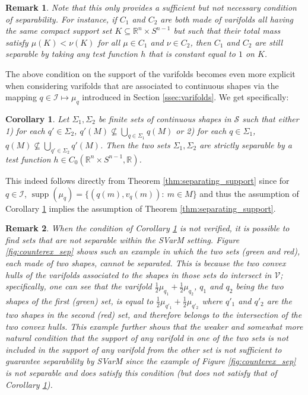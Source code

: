 \documentclass[11pt]{article}
\newtheorem{remark}{Remark}
\newtheorem{corollary}{Corollary}
\newcommand{\R}{\mathbb{R}}
\begin{document}
\begin{remark}
    Note that this only provides a sufficient but not necessary condition of separability. For instance, if $C_1$ and $C_2$ are both made of varifolds all having the same compact support set $K\subseteq \R^n \times S^{n-1}$ but such that their total mass satisfy $\mu(K)<\nu(K)$ for all $\mu \in C_1$ and $\nu \in C_2$, then $C_1$ and $C_2$ are still separable by taking any test function $h$ that is constant equal to $1$ on $K$.
\end{remark}
The above condition on the support of the varifolds becomes even more explicit when considering varifolds that are associated to continuous shapes via the mapping $q \in \mathcal{I} \mapsto \mu_q$ introduced in Section \ref{ssec:varifolds}. We get specifically:
\begin{corollary}\label{cor:separating_shapes}
    Let $\Sigma_1, \Sigma_2$ be finite sets of continuous shapes in $\mathcal{S}$ such that either 1) for each $q' \in \Sigma_2$, $q'(M)\not\subseteq \bigcup_{q\in \Sigma_1} q(M)$ or 2) for each $q \in \Sigma_1$, $q(M)\not\subseteq \bigcup_{q'\in \Sigma_2} q'(M)$. Then the two sets $\Sigma_1, \Sigma_2$ are strictly separable by a test function $h \in C_0(\R^n\times S^{n-1},\R)$.
\end{corollary}
This indeed follows directly from Theorem \ref{thm:separating_support} since for $q \in \mathcal{I}$, $\operatorname{supp}(\mu_q) = \{(q(m),v_q(m)): \ m \in M\}$ and thus the assumption of Corollary \ref{cor:separating_shapes} implies the assumption of Theorem \ref{thm:separating_support}. 
\begin{remark}
When the condition of Corollary \ref{cor:separating_shapes} is not verified, it is possible to find sets that are not separable within the SVarM setting. Figure \ref{fig:counterex_sep} shows such an example in which the two sets (green and red), each made of two shapes, cannot be separated. This is because the two convex hulls of the varifolds associated to the shapes in those sets do intersect in $\mathcal{V}$; specifically, one can see that the varifold $\frac{1}{2}\mu_{q_1} + \frac{1}{2} \mu_{q_2}$, $q_1$ and $q_2$ being the two shapes of the first (green) set, is equal to $\frac{1}{2}\mu_{q'_1} + \frac{1}{2} \mu_{q'_2}$ where $q'_1$ and $q'_2$ are the two shapes in the second (red) set, and therefore belongs to the intersection of the two convex hulls. This example further shows that the weaker and somewhat more natural condition that the support of any varifold in one of the two sets is not included in the support of any varifold from the other set is not sufficient to guarantee separability by SVarM since the example of Figure \ref{fig:counterex_sep} is not separable and does satisfy this condition (but does not satisfy that of Corollary \ref{cor:separating_shapes}).  
\end{remark}
\end{document}

